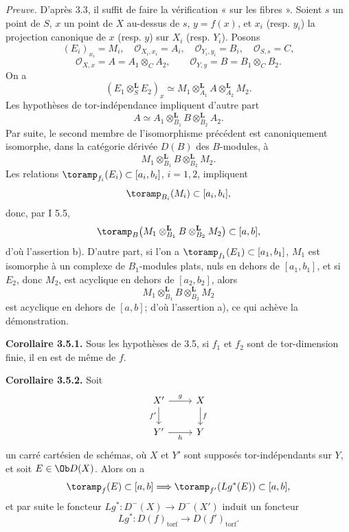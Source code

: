 \documentclass[11pt]{article}
\begin{document}
\emph{Preuve.} D'après 3.3, il suffit de faire la vérification « sur les fibres ». Soient \(s\) un point de \(S\), \(x\) un point de \(X\) au-dessus de \(s\), \(y=f(x)\), et \(x_i\) (resp. \(y_i\)) la projection canonique de \(x\) (resp. \(y\)) sur \(X_i\) (resp. \(Y_i\)). Posons
\[
  (E_i)_{x_i}=M_i,\quad \mathcal O_{X_i,x_i}=A_i,\quad
  \mathcal O_{Y_i,y_i}=B_i,\quad \mathcal O_{S,s}=C,
\]
\[
  \mathcal O_{X,x}=A=A_1\otimes_C A_2,\qquad
  \mathcal O_{Y,y}=B=B_1\otimes_C B_2.
\]
On a
\[
  (E_1\otimes_S^{\mathbf L}E_2)_x
  \simeq
  M_1\otimes_{A_1}^{\mathbf L}A\otimes_{A_2}^{\mathbf L}M_2.
\]
Les hypothèses de tor-indépendance impliquent d'autre part
\[
  A\simeq A_1\otimes_{B_1}^{\mathbf L}B\otimes_{B_2}^{\mathbf L}A_2.
\]
Par suite, le second membre de l'isomorphisme précédent est canoniquement isomorphe, dans la catégorie dérivée \(D(B)\) des \(B\)-modules, à
\[
  M_1\otimes_{B_1}^{\mathbf L}B\otimes_{B_2}^{\mathbf L}M_2.
\]
Les relations \(\toramp_{f_i}(E_i)\subset[a_i,b_i]\), \(i=1,2\), impliquent
\[
  \toramp_{B_i}(M_i)\subset[a_i,b_i],
\]
donc, par I 5.5,
\[
  \toramp_B\bigl(M_1\otimes_{B_1}^{\mathbf L}B\otimes_{B_2}^{\mathbf L}M_2\bigr)\subset[a,b],
\]
d'où l'assertion b). D'autre part, si l'on a \(\toramp_{f_1}(E_1)\subset[a_1,b_1]\), \(M_1\) est isomorphe à un complexe de \(B_1\)-modules plats, nuls en dehors de \([a_1,b_1]\), et si \(E_2\), donc \(M_2\), est acyclique en dehors de \([a_2,b_2]\), alors
\[
  M_1\otimes_{B_1}^{\mathbf L}B\otimes_{B_2}^{\mathbf L}M_2
\]
est acyclique en dehors de \([a,b]\); d'où l'assertion a), ce qui achève la démonstration.

\textbf{Corollaire 3.5.1.} Sous les hypothèses de 3.5, si \(f_1\) et \(f_2\) sont de tor-dimension finie, il en est de même de \(f\).

\textbf{Corollaire 3.5.2.} Soit
\[
\begin{tikzcd}
X' \arrow[r,"g"] \arrow[d,"f'"'] & X \arrow[d,"f"]\\
Y' \arrow[r,"h"'] & Y
\end{tikzcd}
\]
un carré cartésien de schémas, où \(X\) et \(Y'\) sont supposés tor-indépendants sur \(Y\), et soit \(E\in\Ob D(X)\). Alors on a
\[
  \toramp_f(E)\subset[a,b]\Longrightarrow
  \toramp_{f'}(Lg^*(E))\subset[a,b],
\]
et par suite le foncteur \(Lg^*:D^{-}(X)\to D^{-}(X')\) induit un foncteur
\[
  Lg^*:D(f)_{\mathrm{torf}}\longrightarrow D(f')_{\mathrm{torf}} .
\]
\end{document}

